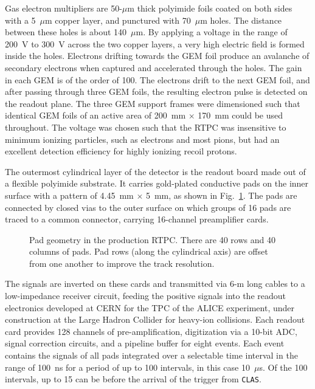 Gas electron multipliers are 50-$\mu$m thick polyimide foils coated on both 
sides with a 5~$\mu$m copper layer, and punctured with 70~$\mu$m holes. The 
distance between these holes is about 140~$\mu$m.  By applying a voltage in 
the range of 200~V to 300~V across the two copper layers, a very high 
electric field is formed inside the holes.  Electrons drifting towards the 
GEM foil produce an avalanche of secondary electrons when captured and 
accelerated through the holes.  The gain in each GEM is of the order of 100.
The electrons drift to the next GEM foil, and after passing through three GEM 
foils, the resulting electron pulse is detected on the readout plane.  The 
three GEM support frames were dimensioned such that identical GEM foils of 
an active area of 200~mm $\times$ 170~mm could be used throughout.  The 
voltage was chosen such that the RTPC was insensitive to minimum ionizing 
particles, such as electrons and most pions, but had an excellent detection 
efficiency for highly ionizing recoil protons.

The outermost cylindrical layer of the detector is the readout board made out
of a flexible polyimide substrate. It carries gold-plated conductive pads
on the inner surface with a pattern of 4.45~mm $\times$ 5~mm, as shown
in Fig.~\ref{fig:padpat}. The pads are connected by closed vias to the
outer surface on which groups of 16 pads are traced to a common connector,
carrying 16-channel preamplifier cards.

\begin{figure}[htbp]
\vspace{6.5cm}
\caption{\small{Pad geometry in the production RTPC. There are 40 rows and
40 columns of pads. Pad rows (along the cylindrical axis) are offset from 
one another to improve the track resolution.}}
\label{fig:padpat}
\end{figure}

The signals are inverted on these cards and transmitted via 6-m long cables 
to a low-impedance receiver circuit, feeding the positive signals into the 
readout electronics developed at CERN for the TPC of the ALICE experiment, 
under construction at the Large Hadron Collider for heavy-ion collisions.
Each readout card provides 128 channels of pre-amplification, digitization
via a 10-bit ADC, signal correction circuits, and a pipeline buffer for 
eight events.  Each event contains the signals of all pads integrated over 
a selectable time interval in the range of 100~ns for a period of up to 100 
intervals, in this case 10~$\mu$s.  Of the 100 intervals, up to 15 can be 
before the arrival of the trigger from {\tt CLAS}.

